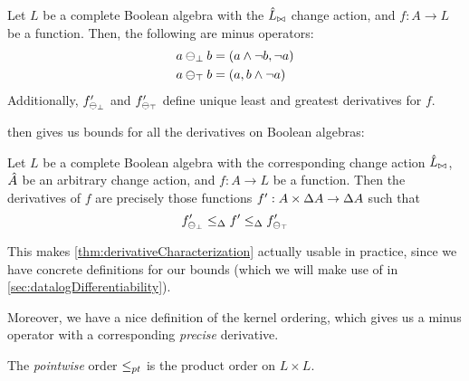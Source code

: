 \begin{prop}
  \label{prop:minimalMaximalDerivatives}
  Let $L$ be a complete Boolean algebra with the $\hat{L}_{\bowtie}$ change action, and
  $f: A \rightarrow L$ be a function.
  Then, the following are minus operators:
  \begin{align*}
    a \ominus_\bot b &= (a \wedge \neg b, \neg a)\\
    a \ominus_\top b &= (a, b \wedge \neg a)
  \end{align*}
  Additionally, $f'_{\ominus_{\bot}}$ and $f'_{\ominus_{\top}}$ 
  define unique least and greatest derivatives for $f$.
\end{prop}

 then gives us bounds for
all the derivatives on Boolean algebras:

\begin{corollary}
\label{cor:booleanCharacterization}
  Let $L$ be a complete Boolean algebra with the corresponding change action
  $\hat{L}_{\bowtie}$, $\hat{A}$ be an arbitrary change action, and $f: A \rightarrow
  L$ be a function. Then the derivatives of $f$ are precisely those functions
  $f': A \times \Delta A \rightarrow \Delta A$ such that
  \begin{displaymath}
    f'_{\ominus_{\bot}}
    \leq_\Delta
    f'
    \leq_\Delta
    f'_{\ominus_{\top}}
  \end{displaymath}
\end{corollary}

This makes \cref{thm:derivativeCharacterization} actually usable in practice, since
we have concrete definitions for our bounds (which we will make use of in \cref{sec:datalogDifferentiability}).

Moreover, we have a nice definition of the kernel ordering, which gives us a
minus operator with a corresponding \emph{precise} derivative.

\begin{defn}
  The \emph{pointwise} order $\leq_{pt}$ is the product order on $L \times
  L$.
\end{defn}

